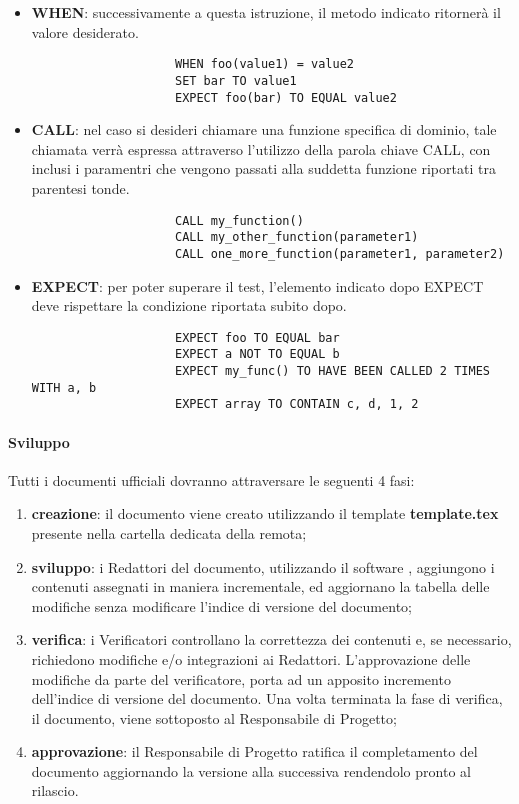 \begin{itemize}
                \item \textbf{WHEN}: successivamente a questa istruzione, il metodo indicato ritornerà il valore desiderato.
                \begin{verbatim}
                    WHEN foo(value1) = value2
                    SET bar TO value1
                    EXPECT foo(bar) TO EQUAL value2
                \end{verbatim}

                \item \textbf{CALL}: nel caso si desideri chiamare una funzione specifica di dominio, tale chiamata verrà espressa attraverso l'utilizzo della parola chiave CALL, con inclusi i paramentri che vengono passati alla suddetta funzione riportati tra parentesi tonde.
                \begin{verbatim}
                    CALL my_function()
                    CALL my_other_function(parameter1)
                    CALL one_more_function(parameter1, parameter2)
                \end{verbatim}

                \item \textbf{EXPECT}: per poter superare il test, l'elemento indicato dopo EXPECT deve rispettare la condizione riportata subito dopo.
                \begin{verbatim}
                    EXPECT foo TO EQUAL bar
                    EXPECT a NOT TO EQUAL b
                    EXPECT my_func() TO HAVE BEEN CALLED 2 TIMES WITH a, b
                    EXPECT array TO CONTAIN c, d, 1, 2
                \end{verbatim}
            \end{itemize}

		\paragraph{Sviluppo}
		Tutti i documenti ufficiali dovranno attraversare le seguenti 4 fasi:
		\begin{enumerate}
			\item \textbf{creazione}: il documento viene creato utilizzando il template \textbf{template.tex} presente nella cartella dedicata della  remota;
			\item \textbf{sviluppo}: i Redattori del documento, utilizzando il software , aggiungono i contenuti assegnati in maniera incrementale, ed aggiornano la tabella delle modifiche senza modificare l'indice di versione del documento;
			\item \textbf{verifica}: i Verificatori controllano la correttezza dei contenuti e, se necessario, richiedono modifiche e/o integrazioni ai Redattori. L'approvazione delle modifiche da parte del verificatore, porta ad un apposito incremento dell'indice di versione del documento. Una volta terminata la fase di verifica, il documento, viene sottoposto al Responsabile di Progetto;
			\item \textbf{approvazione}: il Responsabile di Progetto ratifica il completamento del documento aggiornando la versione alla  successiva rendendolo pronto al rilascio.
		\end{enumerate}

